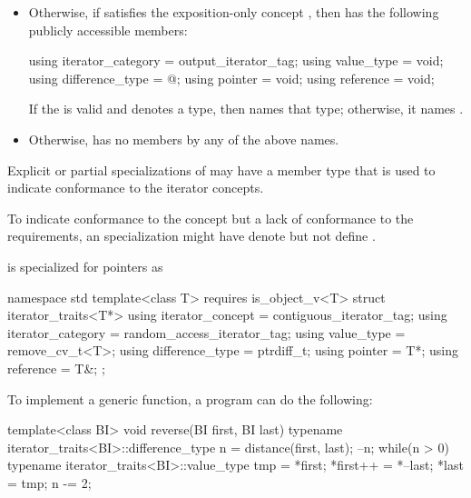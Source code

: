 \begin{itemize}
\item
Otherwise, if  satisfies the exposition-only concept
, then 
has the following publicly accessible
members:
\begin{codeblock}
using iterator_category = output_iterator_tag;
using value_type        = void;
using difference_type   = @\seebelow@;
using pointer           = void;
using reference         = void;
\end{codeblock}
If the 
 is valid and denotes a type,
then  names that type; otherwise, it names .

\item
Otherwise, 
has no members by any of the above names.
\end{itemize}

\pnum
Explicit or partial specializations of  may
have a member type  that is used to indicate
conformance to the iterator concepts.
\begin{example}
To indicate conformance to the  concept
but a lack of conformance to
the  requirements,
an  specialization might have
 denote 
but not define .
\end{example}

\pnum
{} is specialized for pointers as
\begin{codeblock}
namespace std {
  template<class T>
    requires is_object_v<T>
  struct iterator_traits<T*> {
    using iterator_concept  = contiguous_iterator_tag;
    using iterator_category = random_access_iterator_tag;
    using value_type        = remove_cv_t<T>;
    using difference_type   = ptrdiff_t;
    using pointer           = T*;
    using reference         = T&;
  };
}
\end{codeblock}

\pnum
\begin{example}
To implement a generic
function, a \Cpp{} program can do the following:
\begin{codeblock}
template<class BI>
void reverse(BI first, BI last) {
  typename iterator_traits<BI>::difference_type n =
    distance(first, last);
  --n;
  while(n > 0) {
    typename iterator_traits<BI>::value_type
     tmp = *first;
    *first++ = *--last;
    *last = tmp;
    n -= 2;
  }
}
\end{codeblock}
\end{example}

